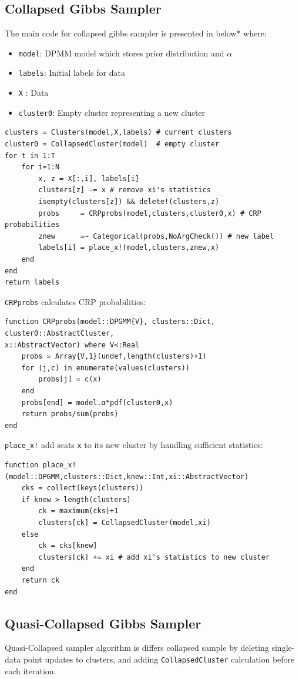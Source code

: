 \documentclass[a4paper]{article}
\begin{document}
\subsection{Collapsed Gibbs Sampler}

The main code for collapsed gibbs sampler is presented in below* where:

\begin{itemize}
\item
  \texttt{model}: DPMM model which stores prior distribution and
  \(\alpha\) 
\item
  \texttt{labels}: Initial labels for data
\item
  \texttt{X} : Data
\item
  \texttt{cluster0}: Empty cluster representing a new cluster
\end{itemize}
\begin{lstlisting}
clusters = Clusters(model,X,labels) # current clusters
cluster0 = CollapsedCluster(model)  # empty cluster
for t in 1:T
 	for i=1:N
        x, z = X[:,i], labels[i]
        clusters[z] -= x # remove xi's statistics
        isempty(clusters[z]) && delete!(clusters,z)
        probs     = CRPprobs(model,clusters,cluster0,x) # CRP probabilities
        znew      =~ Categorical(probs,NoArgCheck()) # new label
        labels[i] = place_x!(model,clusters,znew,x)
    end
end
return labels
\end{lstlisting}

\texttt{CRPprobs} calculates CRP probabilities:
\begin{lstlisting}
function CRPprobs(model::DPGMM{V}, clusters::Dict, cluster0::AbstractCluster, 
x::AbstractVector) where V<:Real
    probs = Array{V,1}(undef,length(clusters)+1)
    for (j,c) in enumerate(values(clusters))
        probs[j] = c(x)
    end
    probs[end] = model.α*pdf(cluster0,x)
    return probs/sum(probs)
end
\end{lstlisting}
\texttt{place\_x!} add seats \texttt{x} to its new cluster by handling
sufficient statistics:
\begin{lstlisting}
function place_x!(model::DPGMM,clusters::Dict,knew::Int,xi::AbstractVector)
    cks = collect(keys(clusters))
    if knew > length(clusters)
        ck = maximum(cks)+1
        clusters[ck] = CollapsedCluster(model,xi)
    else
        ck = cks[knew]
        clusters[ck] += xi # add xi's statistics to new cluster
    end
    return ck
end
\end{lstlisting}

\subsection{Quasi-Collapsed Gibbs Sampler}
Quasi-Collapsed sampler algorithm is differs collapsed sample by deleting single-data point updates to clusters, and adding \texttt{CollapsedCluster} calculation before each iteration.
\end{document}
